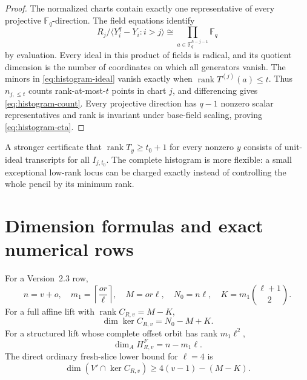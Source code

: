 \documentclass[11pt]{article}
\newcommand{\F}{\mathbb F}
\newcommand{\rank}{\operatorname{rank}}
\begin{document}
\begin{proof}
The normalized charts contain exactly one representative of every projective
$\F_q$-direction.  The field equations identify
\[
 R_j/\langle Y_i^q-Y_i:i>j\rangle
 \cong\prod_{a\in\F_q^{h-j-1}}\F_q
\]
by evaluation.  Every ideal in this product of fields is radical, and its
quotient dimension is the number of coordinates on which all generators
vanish.  The minors in \eqref{eq:histogram-ideal} vanish exactly when
$\rank T^{(j)}(a)\le t$.  Thus $n_{j,\le t}$ counts rank-at-most-$t$ points
in chart $j$, and differencing gives \eqref{eq:histogram-count}.  Every
projective direction has $q-1$ nonzero scalar representatives and rank is
invariant under base-field scaling, proving \eqref{eq:histogram-eta}.
\end{proof}

A stronger certificate that $\rank T_y\ge t_0+1$ for every nonzero $y$
consists of unit-ideal transcripts for all $I_{j,t_0}$.  The complete histogram is more
flexible: a small exceptional low-rank locus can be charged exactly instead of
controlling the whole pencil by its minimum rank.

\section{Dimension formulas and exact numerical rows}\label{app:dimensions}
For a Version~2.3 row,
\[
 n=v+o,
 \quad m_1=\left\lceil\frac{or}{\ell}\right\rceil,
 \quad M=or\ell,
 \quad N_0=n\ell,
 \quad K=m_1\binom{\ell+1}{2}.
\]
For a full affine lift with $\rank C_{R,v}=M-K$,
\[
 \dim\ker C_{R,v}=N_0-M+K.
\]
For a structured lift whose complete offset orbit has rank $m_1\ell^2$,
\[
 \dim_AH^F_{R,v}=n-m_1\ell.
\]
The direct ordinary fresh-slice lower bound for $\ell=4$ is
\[
 \dim(V'\cap\ker C_{R,v})\ge4(v-1)-(M-K).
\]
\end{document}
